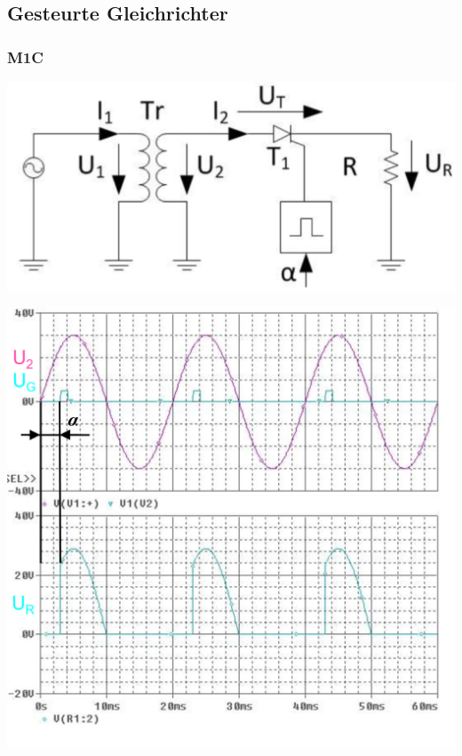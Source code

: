 \subsection{Gesteurte Gleichrichter}
\subsubsection{M1C}
\vspace{-0.5cm}
\begin{minipage}{0.4\linewidth}
    \includegraphics[width=\linewidth]{images/GRM1c}
\end{minipage}
\begin{minipage}{0.35\linewidth}
    \centering %
    \includegraphics[width=\linewidth]{images/M1CKl}

\end{minipage}
